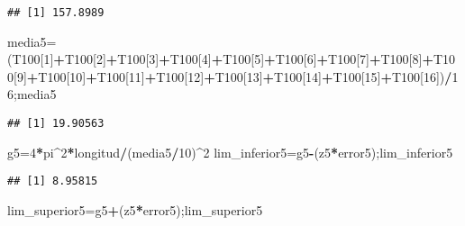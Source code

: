 \documentclass[
]{article}
\newenvironment{Shaded}{\begin{snugshade}}{\end{snugshade}}
\newcommand{\DecValTok}[1]{\textcolor[rgb]{0.00,0.00,0.81}{#1}}
\newcommand{\NormalTok}[1]{#1}
\newcommand{\OtherTok}[1]{\textcolor[rgb]{0.56,0.35,0.01}{#1}}
\newcommand{\SpecialCharTok}[1]{\textcolor[rgb]{0.81,0.36,0.00}{\textbf{#1}}}
\begin{document}
\begin{verbatim}
## [1] 157.8989
\end{verbatim}

\begin{Shaded}
\begin{Highlighting}[]
\NormalTok{media5}\OtherTok{=}\NormalTok{(T100[}\DecValTok{1}\NormalTok{]}\SpecialCharTok{+}\NormalTok{T100[}\DecValTok{2}\NormalTok{]}\SpecialCharTok{+}\NormalTok{T100[}\DecValTok{3}\NormalTok{]}\SpecialCharTok{+}\NormalTok{T100[}\DecValTok{4}\NormalTok{]}\SpecialCharTok{+}\NormalTok{T100[}\DecValTok{5}\NormalTok{]}\SpecialCharTok{+}\NormalTok{T100[}\DecValTok{6}\NormalTok{]}\SpecialCharTok{+}\NormalTok{T100[}\DecValTok{7}\NormalTok{]}\SpecialCharTok{+}\NormalTok{T100[}\DecValTok{8}\NormalTok{]}\SpecialCharTok{+}\NormalTok{T100[}\DecValTok{9}\NormalTok{]}\SpecialCharTok{+}\NormalTok{T100[}\DecValTok{10}\NormalTok{]}\SpecialCharTok{+}\NormalTok{T100[}\DecValTok{11}\NormalTok{]}\SpecialCharTok{+}\NormalTok{T100[}\DecValTok{12}\NormalTok{]}\SpecialCharTok{+}\NormalTok{T100[}\DecValTok{13}\NormalTok{]}\SpecialCharTok{+}\NormalTok{T100[}\DecValTok{14}\NormalTok{]}\SpecialCharTok{+}\NormalTok{T100[}\DecValTok{15}\NormalTok{]}\SpecialCharTok{+}\NormalTok{T100[}\DecValTok{16}\NormalTok{])}\SpecialCharTok{/}\DecValTok{16}\NormalTok{;media5}
\end{Highlighting}
\end{Shaded}

\begin{verbatim}
## [1] 19.90563
\end{verbatim}

\begin{Shaded}
\begin{Highlighting}[]
\NormalTok{g5}\OtherTok{=}\DecValTok{4}\SpecialCharTok{*}\NormalTok{pi}\SpecialCharTok{\^{}}\DecValTok{2}\SpecialCharTok{*}\NormalTok{longitud}\SpecialCharTok{/}\NormalTok{(media5}\SpecialCharTok{/}\DecValTok{10}\NormalTok{)}\SpecialCharTok{\^{}}\DecValTok{2}
\NormalTok{lim\_inferior5}\OtherTok{=}\NormalTok{g5}\SpecialCharTok{{-}}\NormalTok{(z5}\SpecialCharTok{*}\NormalTok{error5);lim\_inferior5}
\end{Highlighting}
\end{Shaded}

\begin{verbatim}
## [1] 8.95815
\end{verbatim}

\begin{Shaded}
\begin{Highlighting}[]
\NormalTok{lim\_superior5}\OtherTok{=}\NormalTok{g5}\SpecialCharTok{+}\NormalTok{(z5}\SpecialCharTok{*}\NormalTok{error5);lim\_superior5}
\end{Highlighting}
\end{Shaded}
\end{document}
